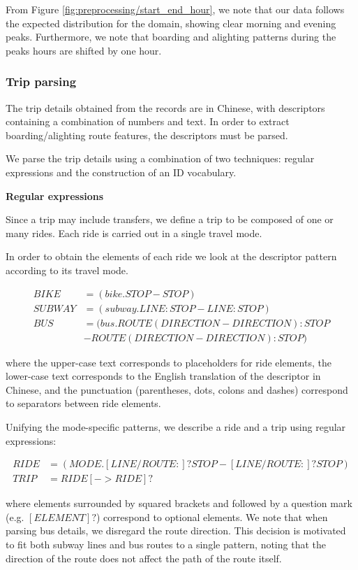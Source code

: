 \documentclass{article}
\begin{document}
From Figure \ref{fig:preprocessing/start_end_hour}, we note that our data follows the expected distribution for the domain, showing clear morning and evening peaks. Furthermore, we note that boarding and alighting patterns during the peaks hours are shifted by one hour. %

\subsubsection{Trip parsing} 
\label{sec:tripParsing}
The trip details obtained from the records are in Chinese, with descriptors containing a combination of numbers and text. In order to extract boarding/alighting route features, the descriptors must be parsed. 

We parse the trip details using a combination of two techniques: regular expressions and the construction of an ID vocabulary. 

\textbf{Regular expressions}

Since a trip may include transfers, we define a trip to be composed of one or many rides. Each ride is carried out in a single travel mode. 

In order to obtain the elements of each ride we look at the descriptor pattern according to its travel mode.

    \begin{align*}
    BIKE &= (bike.STOP-STOP) \\
    SUBWAY &= (subway.LINE:STOP-LINE:STOP) \\
    BUS &= (bus.ROUTE(DIRECTION-DIRECTION):STOP \\
    &-ROUTE(DIRECTION-DIRECTION):STOP)
	\end{align*}
	
where the upper-case text corresponds to placeholders for ride elements, the lower-case text corresponds to the English translation of the descriptor in Chinese, and the punctuation (parentheses, dots, colons and dashes) correspond to separators between ride elements.

Unifying the mode-specific patterns, we describe a ride and a trip using regular expressions:
    
	\begin{align*}	        
    RIDE &= (MODE.[LINE/ROUTE:]?STOP-[LINE/ROUTE:]?STOP) \\
    TRIP &= RIDE[->RIDE]? 
	\end{align*}    
	
where elements surrounded by squared brackets and followed by a question mark (e.g. $[ELEMENT]?$) correspond to optional elements. We note that when parsing bus details, we disregard the route direction. This decision is motivated to fit both subway lines and bus routes to a single pattern, noting that the direction of the route does not affect the path of the route itself.
\end{document}
